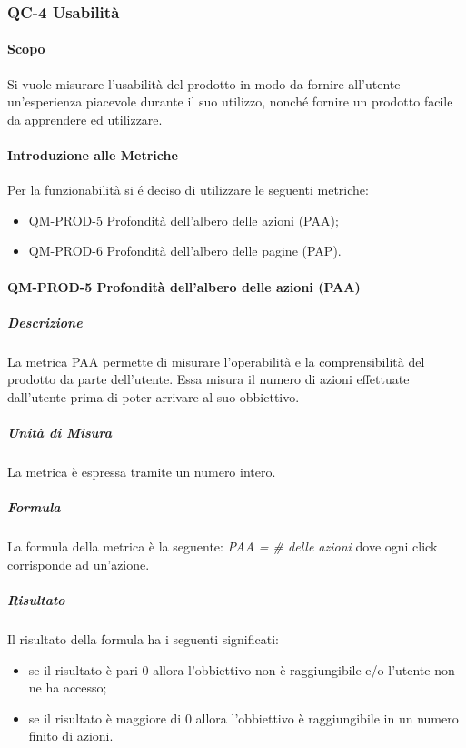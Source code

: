 	\subsubsection{QC-4 Usabilità}
		\paragraph{Scopo}
		Si vuole misurare l'usabilità del prodotto in modo da fornire all'utente un'esperienza piacevole durante il suo utilizzo, nonché fornire un prodotto facile da apprendere ed utilizzare.
		\paragraph{Introduzione alle Metriche}
			Per la funzionabilità si é deciso di utilizzare le seguenti metriche:
			\begin{itemize}
				\item QM-PROD-5 Profondità dell'albero delle azioni (PAA);
				\item QM-PROD-6 Profondità dell'albero delle pagine (PAP).
			\end{itemize}
		\paragraph{QM-PROD-5 Profondità dell'albero delle azioni (PAA)}
			\subparagraph{Descrizione}
				La metrica PAA permette di misurare l'operabilità e la comprensibilità del prodotto da parte dell'utente. Essa misura il numero di azioni effettuate dall'utente prima di poter arrivare al suo obbiettivo.
			\subparagraph{Unità di Misura}
				La metrica è espressa tramite un numero intero.
			\subparagraph{Formula}
				La formula della metrica è la seguente:
				\textit{PAA = \# delle azioni}
				dove ogni click corrisponde ad un'azione.
			\subparagraph{Risultato}
				Il risultato della formula ha i seguenti significati:
				\begin{itemize}
					\item se il risultato è pari 0 allora l'obbiettivo non è raggiungibile e/o l'utente non ne ha accesso;
					\item se il risultato è maggiore di 0 allora l'obbiettivo è raggiungibile in un numero finito di azioni.
				\end{itemize}
